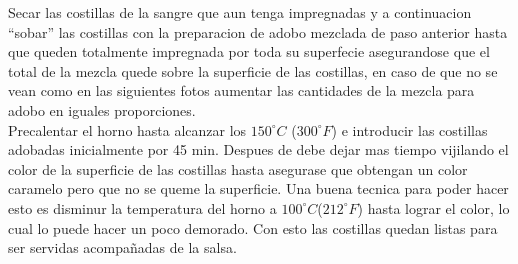Secar las costillas de la sangre que aun tenga impregnadas y a continuacion “sobar” las costillas con la preparacion de adobo mezclada de paso anterior hasta que queden totalmente impregnada por toda su superfecie asegurandose que el total de la mezcla quede sobre la superficie de las costillas, en caso de que no se vean como en las siguientes fotos aumentar las cantidades de la mezcla para adobo en iguales proporciones.\\

Precalentar el horno hasta alcanzar los $150^{\circ}C$ ($300^{\circ}F$) e introducir las costillas adobadas inicialmente por 45 min. Despues de debe dejar mas tiempo vijilando el color de la superficie de las costillas hasta asegurase que obtengan un color caramelo pero que no se queme la superficie. Una buena tecnica para poder hacer esto es disminur la temperatura del horno a $100^{\circ}C$($212^{\circ}F$) hasta lograr el color, lo cual lo puede hacer un poco demorado. Con esto las costillas quedan listas para ser servidas acompañadas de la salsa.\\
